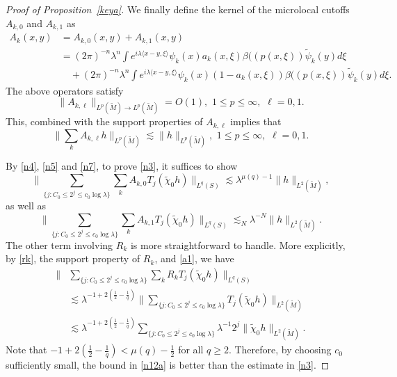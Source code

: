 \documentclass[10pt]{amsart}
\newcommand{\la}{\lambda}
\newcommand{\1}{{\bf 1}}
\begin{document}
\begin{proof}[Proof of Proposition~\ref{keya}]
We finally define the kernel of the microlocal cutoffs $A_{k,0}$ and $A_{k,1}$ as 
\begin{equation}\label{n7}
\begin{aligned}
A_k(x,y)&=A_{k,0}(x,y)+A_{k,1}(x,y)\\
     &=(2\pi)^{-n}\la^n\int e^{i\la\langle x-y,\xi \rangle}\psi_k(x)a_k(x,\xi)\beta((p(x,\xi))\tilde\psi_k(y)d\xi\\
     &\quad+ (2\pi)^{-n}\la^n\int e^{i\la\langle x-y,\xi \rangle}\psi_k(x)(1-a_k(x,\xi))\beta((p(x,\xi))\tilde\psi_k(y)d\xi.
\end{aligned}
\end{equation}
The above operators satisfy
\begin{equation}\label{n10}
\| A_{k,\ell}\|_{L^p(\tilde M)\to L^p(\tilde M)}=O(1), \,\, 1\le p\le \infty,\,\,\ell=0,1.
\end{equation}
This, combined with the support properties of $ A_{k,\ell}$  implies that
\begin{equation}\label{n11}
\| \sum_{k}A_{k,\ell}h\|_{L^p(\tilde M)}\lesssim \|h\|_{L^p(\tilde M)}, \,\, 1\le p\le \infty,\,\,\ell=0,1.
\end{equation}


By \eqref{n4}, \eqref{n5} and \eqref{n7}, to prove \eqref{n3}, it suffices to show 
\begin{equation}\label{n12}
        \|\sum_{\{j:C_0\le 2^j\le c_0\log\la\}}\sum_{k}A_{k,0} T_j(\tilde \chi_0 h)\|_{L^q(S)}\lesssim 
    \la^{\mu(q)-1}\|h\|_{L^2(\tilde M)},
\end{equation}
as well as 
\begin{equation}\label{n13}
        \|\sum_{\{j:C_0\le 2^j\le c_0\log\la\}}\sum_{k}A_{k,1} T_j(\tilde \chi_0 h)\|_{L^q(S)}\lesssim_N
    \la^{-N}\|h\|_{L^2(\tilde M)}.
\end{equation}
The other term involving $R_k$ is more straightforward to handle. More explicitly, by \eqref{rk}, the support property of $R_k$, and \eqref{a1},  we have 
\begin{equation}\label{n12a}
\begin{aligned}
       \|&\sum_{\{j:C_0\le 2^j\le c_0\log\la\}}\sum_{k}R_{k} T_j(\tilde \chi_0 h)\|_{L^q(S)}\\
       &\lesssim \la^{-1+2(\frac12-\frac1q)} \|\sum_{\{j:C_0\le 2^j\le c_0\log\la\}} T_j(\tilde \chi_0 h)\|_{L^2(\tilde M)}\\
       &\lesssim 
    \la^{-1+2(\frac12-\frac1q)} \sum_{\{j:C_0\le 2^j\le c_0\log\la\}}\la^{-1}2^{j}\|\tilde \chi_0 h\|_{L^2(\tilde M)}.
\end{aligned}
\end{equation}
Note that $-1+2(\frac12-\frac1q)<\mu(q)-\frac12$ for all $q\ge 2$. Therefore,  by choosing $c_0$ sufficiently small, the bound in \eqref{n12a} is better than the estimate in \eqref{n3}.


\end{proof}
\end{document}
